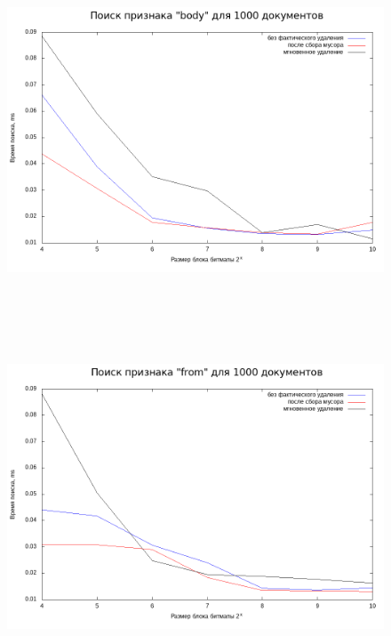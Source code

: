 \begin{figure}[H]
\includegraphics[width=\linewidth, height=10cm]{fig/limit_1/1e3/body_time.png}
\includegraphics[width=\linewidth, height=11cm]{fig/limit_1/1e3/from_time.png}
\end{figure}

